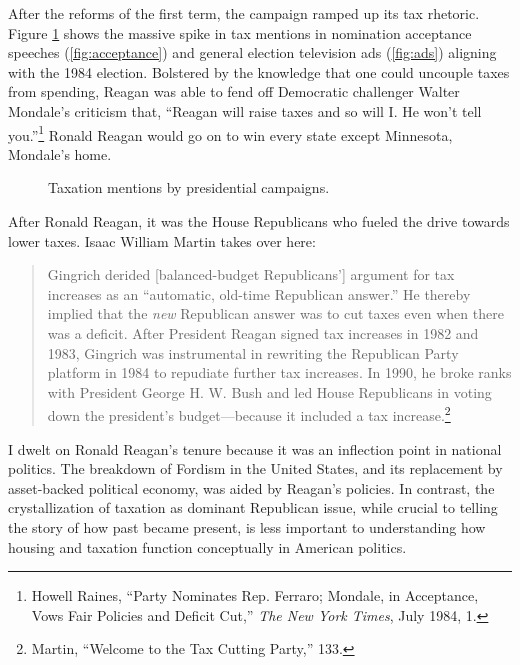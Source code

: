 \documentclass[12pt,oneside]{psthesis}
\begin{document}
After the reforms of the first term, the campaign ramped up its tax rhetoric.
Figure \ref{fig:taxation} shows the massive spike in tax mentions in nomination acceptance speeches (\ref{fig:acceptance}) and general election television ads (\ref{fig:ads}) aligning with the 1984 election.
Bolstered by the knowledge that one could uncouple taxes from spending, Reagan was able to fend off Democratic challenger Walter Mondale's criticism that, ``Reagan will raise taxes and so will I. He won't tell you.''\footnote{Howell Raines, ``Party Nominates Rep. Ferraro; Mondale, in Acceptance, Vows Fair Policies and Deficit Cut,'' \emph{The New York Times}, July 1984, 1.}
Ronald Reagan would go on to win every state except Minnesota, Mondale's home.
\begin{figure}

{\centering {}

}

\caption{Taxation mentions by presidential campaigns.}\label{fig:taxation}
\end{figure}
After Ronald Reagan, it was the House Republicans who fueled the drive towards lower taxes.
Isaac William Martin takes over here:
\begin{quote}
Gingrich derided {[}balanced-budget Republicans'{]} argument for tax increases as an ``automatic, old-time Republican answer.'' He thereby implied that the \emph{new} Republican answer was to cut taxes even when there was a deficit. After President Reagan signed tax increases in 1982 and 1983, Gingrich was instrumental in rewriting the Republican Party platform in 1984 to repudiate further tax increases. In 1990, he broke ranks with President George H. W. Bush and led House Republicans in voting down the president's budget---because it included a tax increase.\footnote{Martin, ``Welcome to the Tax Cutting Party,'' 133.}
\end{quote}
I dwelt on Ronald Reagan's tenure because it was an inflection point in national politics.
The breakdown of Fordism in the United States, and its replacement by asset-backed political economy, was aided by Reagan's policies.
In contrast, the crystallization of taxation as dominant Republican issue, while crucial to telling the story of how past became present, is less important to understanding how housing and taxation function conceptually in American politics.
\end{document}
